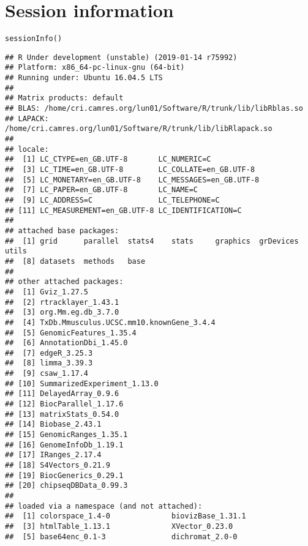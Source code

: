 \documentclass{report}\usepackage[]{graphicx}\usepackage[usenames,dvipsnames]{color}
\newcommand{\hlstd}[1]{\textcolor[rgb]{0.251,0.251,0.251}{#1}}%
\newcommand{\hlkwd}[1]{\textcolor[rgb]{0.878,0.439,0.125}{#1}}%
\newenvironment{knitrout}{}{} %
\begin{document}
\section{Session information}
\begin{knitrout}
\color{fgcolor}\begin{kframe}
\begin{alltt}
\hlkwd{sessionInfo}\hlstd{()}
\end{alltt}
\begin{verbatim}
## R Under development (unstable) (2019-01-14 r75992)
## Platform: x86_64-pc-linux-gnu (64-bit)
## Running under: Ubuntu 16.04.5 LTS
## 
## Matrix products: default
## BLAS: /home/cri.camres.org/lun01/Software/R/trunk/lib/libRblas.so
## LAPACK: /home/cri.camres.org/lun01/Software/R/trunk/lib/libRlapack.so
## 
## locale:
##  [1] LC_CTYPE=en_GB.UTF-8       LC_NUMERIC=C              
##  [3] LC_TIME=en_GB.UTF-8        LC_COLLATE=en_GB.UTF-8    
##  [5] LC_MONETARY=en_GB.UTF-8    LC_MESSAGES=en_GB.UTF-8   
##  [7] LC_PAPER=en_GB.UTF-8       LC_NAME=C                 
##  [9] LC_ADDRESS=C               LC_TELEPHONE=C            
## [11] LC_MEASUREMENT=en_GB.UTF-8 LC_IDENTIFICATION=C       
## 
## attached base packages:
##  [1] grid      parallel  stats4    stats     graphics  grDevices utils    
##  [8] datasets  methods   base     
## 
## other attached packages:
##  [1] Gviz_1.27.5                             
##  [2] rtracklayer_1.43.1                      
##  [3] org.Mm.eg.db_3.7.0                      
##  [4] TxDb.Mmusculus.UCSC.mm10.knownGene_3.4.4
##  [5] GenomicFeatures_1.35.4                  
##  [6] AnnotationDbi_1.45.0                    
##  [7] edgeR_3.25.3                            
##  [8] limma_3.39.3                            
##  [9] csaw_1.17.4                             
## [10] SummarizedExperiment_1.13.0             
## [11] DelayedArray_0.9.6                      
## [12] BiocParallel_1.17.6                     
## [13] matrixStats_0.54.0                      
## [14] Biobase_2.43.1                          
## [15] GenomicRanges_1.35.1                    
## [16] GenomeInfoDb_1.19.1                     
## [17] IRanges_2.17.4                          
## [18] S4Vectors_0.21.9                        
## [19] BiocGenerics_0.29.1                     
## [20] chipseqDBData_0.99.3                    
## 
## loaded via a namespace (and not attached):
##  [1] colorspace_1.4-0              biovizBase_1.31.1            
##  [3] htmlTable_1.13.1              XVector_0.23.0               
##  [5] base64enc_0.1-3               dichromat_2.0-0              

\end{verbatim}
\end{kframe}
\end{knitrout}
\end{document}
